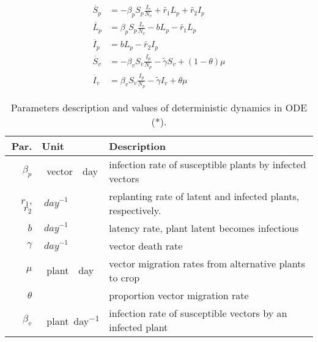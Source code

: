 \begin{equation} 
	\label{system_1} 
	\begin{aligned} 
		\dot{S_p} &= 
			-\beta_p S_p
			\frac{I_v}{N_v} + \tilde{r_1} L_p + \tilde{r_2} I_p  
		\\ 
		\dot{L_p} &= 
			\beta_p S_p
			\frac{I_v}{N_v} - b L_p - \tilde{r_1} L_p  
		\\ 
		\dot{I_p} &= 
			b L_p - \tilde{r_2} I_p  \\ 
		\dot{S_v} &= 
			-\beta_v S_v 
			\frac{I_p}{N_p} - \tilde{\gamma} S_v
			+(1-\theta) \mu  
		\\ 
		\dot{I_v} &= 
			\beta_v S_v \frac{I_p}{N_p} 
			- \tilde{\gamma} I_v
			+ \theta \mu 
	\end{aligned} 
\end{equation} 
\begin{table}
	\begin{center}
		\begin{tabular}{rll} 
			\toprule
			Par. & Unit & Description 
			\\ 
			\midrule
				$\beta_p$ 
				& 
					\SI{}{vector \per day}
				& 
					infection rate of susceptible 
					plants by infected vectors 
			\\ 
				$r_1$, $r_2$ 
				& 
					$\SI{}{day}^{-1}$ 
				& 
					replanting rate of latent and 
					infected plants, respectively. 
			\\
				$b$ 
				& 
					$\SI{}{day}^{-1}$ 
				& 
					latency rate, plant latent 
					becomes infectious 
			\\
				$\gamma$ 
				& 
					$\SI{}{day}^{-1}$ 
				&  vector death rate 
			\\
				$\mu$ 
				& \SI{}{plant \per day}
				& vector migration rates from alternative plants to crop
			\\
				$\theta$ 
				& 
				& proportion vector migration rate
			\\
				$\beta_v$ 
				& \SI{}{plant\per day}
				& infection rate of susceptible vectors by an infected plant
			\\
			\bottomrule
		\end{tabular}
	\end{center}
	\caption{
		Parameters description and values of
		deterministic dynamics in ODE (*).
	}
	\label{tbl:deterministic_tbl}
\end{table}
